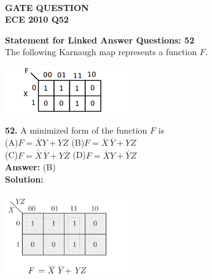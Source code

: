 \documentclass[a4paper,12pt]{article}
\begin{document}
\pagestyle{empty} %

\thispagestyle{fancy} %
\fancyhf{} %
\renewcommand{\headrulewidth}{0pt} %

\vspace{1cm}
\begin{center}

    {\LARGE \textbf{\textcolor{darkskyblue}{\\  GATE QUESTION \\ ECE 2010 Q52}}}
\end{center}
\noindent\textbf{Statement for Linked Answer Questions: 52 } \\[0.3cm]
The following Karnaugh map represents a function \( F \).\\[0.3cm]
\begin{center}
\includegraphics[width=0.4\textwidth]{l.png} \\[0.4cm]
\end{center}
\noindent\textbf{52.} A minimized form of the function \( F \) is\\[0.3cm]
\hspace*{1cm}(A)\quad \( F = \overline{X}Y + YZ \)
\hspace*{1cm}(B)\quad \( F = \overline{X}\,\overline{Y} + YZ \)\\
\hspace*{1cm}(C)\quad \( F = \overline{\overline{X}}\,\overline{Y} + Y\overline{Z} \)
\hspace*{1cm}(D)\quad \( F = \overline{X}Y + \overline{Y}Z \)\\[0.3cm]
\noindent\textbf{Answer:} (B)\\[1cm]
\textbf{Solution:}
\begin{center}
   \includegraphics[width=0.4\textwidth]{q.png} 
\end{center}
\end{document}
